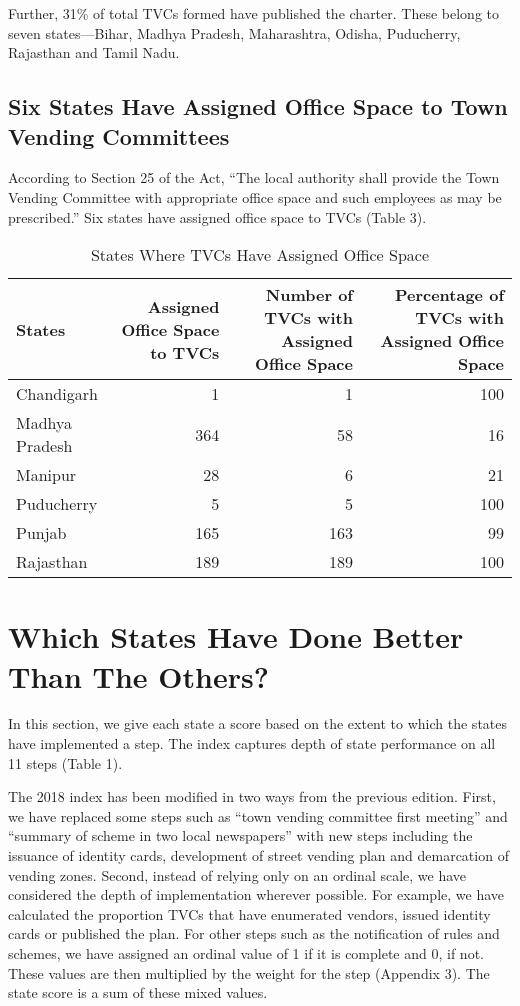 \documentclass[a4paper, 12pt, twoside]{article}
\begin{document}
	Further, 31\% of total TVCs formed have published the charter. These belong to seven states—Bihar, Madhya Pradesh, Maharashtra, Odisha, Puducherry, Rajasthan and Tamil Nadu.

\subsection{Six States Have Assigned Office Space to Town Vending Committees}
	According to Section 25 of the Act, “The local authority shall provide the Town Vending Committee with appropriate office space and such employees as may be prescribed.” Six states have assigned office space to TVCs (Table 3).
	
\begin{table}[htpb]
\caption{States Where TVCs Have Assigned Office Space}
\begin{tabular}{ l  r r r } %
\toprule
States & \multicolumn{1}{p{9em}}{Assigned Office Space to TVCs} & \multicolumn{1}{p{9em}}{Number of TVCs with Assigned Office Space} & \multicolumn{1}{p{9em}}{Percentage of TVCs with Assigned Office Space}\\
\midrule
Chandigarh & 1 & 1 & 100\\
Madhya Pradesh & 364 & 58 & 16\\
Manipur & 28 & 6 & 21\\
Puducherry & 5 & 5 & 100\\
Punjab & 165 & 163 & 99\\
Rajasthan & 189 & 189 & 100\\
\bottomrule 
\end{tabular}
\end{table}

\section{Which States Have Done Better Than The Others?}
In this section, we give each state a score based on the extent to which the states have implemented a step. The index captures depth of state performance on all 11 steps (Table 1). 

	The 2018 index has been modified in two ways from the previous edition. First, we have replaced some steps such as “town vending committee first meeting”  and “summary of scheme in two local newspapers” with new steps including the issuance of identity cards, development of street vending plan and demarcation of vending zones. Second, instead of relying only on an ordinal scale, we have considered the depth of implementation wherever possible. For example, we have calculated the proportion TVCs that have enumerated vendors, issued identity cards or published the plan. For other steps such as the notification of rules and schemes, we have assigned an ordinal value of 1 if it is complete and 0, if not. These values are then multiplied by the weight for the step (Appendix 3). The state score is a sum of these mixed values. 
\end{document}
